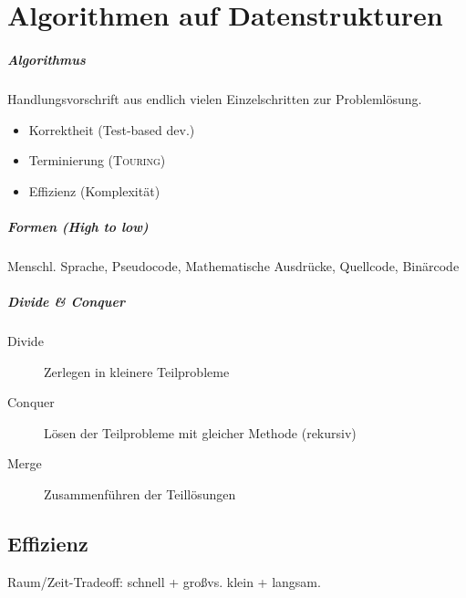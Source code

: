 \chapter{Algorithmen auf Datenstrukturen}

\paragraph{Algorithmus} Handlungsvorschrift aus endlich vielen Einzelschritten zur Problemlösung.

\begin{itemize}
  \item Korrektheit (Test-based dev.)
  \item Terminierung (\textsc{Touring})
  \item Effizienz (Komplexität)
\end{itemize}

\paragraph{Formen (High to low)}
Menschl. Sprache, Pseudocode, Mathematische Ausdrücke, Quellcode, Binärcode

\paragraph{Divide \& Conquer}

\begin{description}
  \item [Divide] Zerlegen in kleinere Teilprobleme

  \item [Conquer] Lösen der Teilprobleme mit gleicher Methode (rekursiv)

  \item [Merge] Zusammenführen der Teillösungen
\end{description}

\section{Effizienz}

Raum/Zeit-Tradeoff: schnell + gro\ss vs. klein + langsam.


